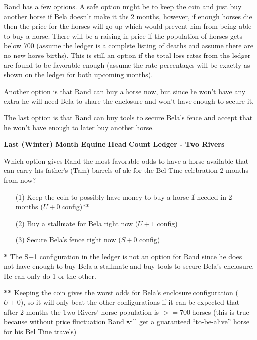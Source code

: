 \documentclass{article}
\begin{document}
Rand has a few options. A safe option might be to keep the coin and just buy
another horse if Bela doesn't make it the 2 months, however, if enough horses
die then the price for the horses will go up which would prevent him from
being able to buy a horse. There will be a raising in price
if the population of horses gets below 700 (assume the ledger is a complete
listing of deaths and assume there are no new horse births). This is still
an option if the total loss rates from the ledger
are found to be favorable enough (assume the rate percentages will be exactly
as shown on the ledger for both upcoming months).

Another option is that Rand can buy a horse now, but since he won't have
any extra he will need Bela to share the enclosure and won't have enough
to secure it.

The last option is that Rand can buy tools to secure Bela's fence and
accept that he won't have enough to later buy another horse.

\vspace{14pt}
\indent \textbf{Last (Winter) Month Equine Head Count Ledger - Two Rivers}

Which option gives Rand the most favorable odds
to have a horse available that can carry his father's (Tam) barrels
of ale for the Bel Tine celebration 2 months from now?
\begin{itemize}
\item[(1)] Keep the coin to possibly have money to buy a horse
if needed in 2 months ($U+0$ config)**
\item[(2)] Buy a stallmate for Bela right now ($U+1$ config)
  \item[(3)] Secure Bela's fence right now ($S+0$ config)
\end{itemize}


\noindent \scriptsize \textbf{*} The S+1 configuration in the ledger is not an
option for Rand since he does not have enough to buy Bela a stallmate and
buy tools to secure Bela's enclosure. He can only do 1 or the other.

\noindent \scriptsize \textbf{**} Keeping the coin gives the worst odds
for Bela's enclosure configuration ($U+0$), so it will only beat the other
configurations
if it can be expected that after 2 months
the Two Rivers' horse population is $>= 700$ horses
(this is true because without price fluctuation Rand will get a guaranteed
``to-be-alive'' horse for his Bel Tine travels)
\end{document}
